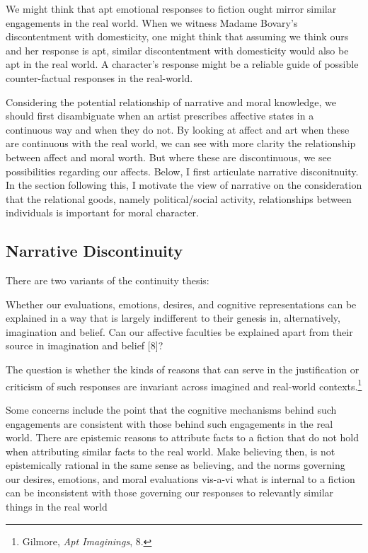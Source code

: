 \documentclass[phdthesis,12pt,final,a4paper]{wuthesis}
\theoremstyle{definition}
\theoremstyle{definition}
\theoremstyle{definition}
\theoremstyle{definition}
\theoremstyle{remark}
\begin{document}
We might think that apt emotional responses to fiction ought mirror similar engagements in the real world. When we witness Madame Bovary's discontentment with domesticity, one might think that assuming we think ours and her response is apt, similar discontentment with domesticity would also be apt in the real world. A character's response might be a reliable guide of possible counter-factual responses in the real-world.

Considering the potential relationship of narrative and moral knowledge, we should first disambiguate when an artist prescribes affective states in a continuous way and when they do not. By looking at affect and art when these are continuous with the real world, we can see with more clarity the relationship between affect and moral worth. But where these are discontinuous, we see possibilities regarding our affects. Below, I first articulate narrative disconitnuity. In the section following this, I motivate the view of narrative on the consideration that the relational goods, namely political/social activity, relationships between individuals is important for moral character.

\subsection*{Narrative Discontinuity}\label{narrative-discontinuity}

There are two variants of the continuity thesis:

Whether our evaluations, emotions, desires, and cognitive representations can be explained in a way that is largely indifferent to their genesis in, alternatively, imagination and belief. Can our affective faculties be explained apart from their source in imagination and belief {[}8{]}?

The question is whether the kinds of reasons that can serve in the justification or criticism of such responses are invariant across imagined and real-world contexts.\footnote{Gilmore, \emph{Apt {Imaginings}}, 8.}

Some concerns include the point that the cognitive mechanisms behind such engagements are consistent with those behind such engagements in the real world. There are epistemic reasons to attribute facts to a fiction that do not hold when attributing similar facts to the real world. Make believing then, is not epistemically rational in the same sense as believing, and the norms governing our desires, emotions, and moral evaluations vis-a-vi what is internal to a fiction can be inconsistent with those governing our responses to relevantly similar things in the real world
\end{document}
